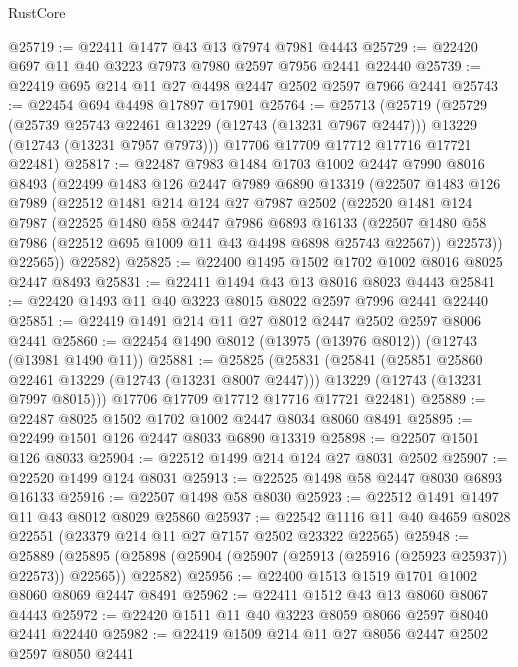 \begin{lexlean}{RustCore}
\begin{coremodule}
@25719 := @22411 @1477 @43 @13 @7974 @7981 @4443
@25729 := @22420 @697 @11 @40 @3223 @7973 @7980 @2597 @7956 @2441 @22440
@25739 := @22419 @695 @214 @11 @27 @4498 @2447 @2502 @2597 @7966 @2441
@25743 := @22454 @694 @4498 @17897 @17901
@25764 := @25713
    (@25719
      (@25729
        (@25739 @25743 @22461 @13229 (@12743 (@13231 @7967 @2447)))
        @13229
        (@12743 (@13231 @7957 @7973)))
      @17706
      @17709
      @17712
      @17716
      @17721
      @22481)
@25817 := @22487
    @7983
    @1484
    @1703
    @1002
    @2447
    @7990
    @8016
    @8493
    (@22499
      @1483
      @126
      @2447
      @7989
      @6890
      @13319
      (@22507
        @1483
        @126
        @7989
        (@22512
          @1481
          @214
          @124
          @27
          @7987
          @2502
          (@22520
            @1481
            @124
            @7987
            (@22525
              @1480
              @58
              @2447
              @7986
              @6893
              @16133
              (@22507 @1480 @58 @7986 (@22512 @695 @1009 @11 @43 @4498 @6898 @25743 @22567))
              @22573))
          @22565))
      @22582)
@25825 := @22400 @1495 @1502 @1702 @1002 @8016 @8025 @2447 @8493
@25831 := @22411 @1494 @43 @13 @8016 @8023 @4443
@25841 := @22420 @1493 @11 @40 @3223 @8015 @8022 @2597 @7996 @2441 @22440
@25851 := @22419 @1491 @214 @11 @27 @8012 @2447 @2502 @2597 @8006 @2441
@25860 := @22454 @1490 @8012 (@13975 (@13976 @8012)) (@12743 (@13981 @1490 @11))
@25881 := @25825
    (@25831
      (@25841
        (@25851 @25860 @22461 @13229 (@12743 (@13231 @8007 @2447)))
        @13229
        (@12743 (@13231 @7997 @8015)))
      @17706
      @17709
      @17712
      @17716
      @17721
      @22481)
@25889 := @22487 @8025 @1502 @1702 @1002 @2447 @8034 @8060 @8491
@25895 := @22499 @1501 @126 @2447 @8033 @6890 @13319
@25898 := @22507 @1501 @126 @8033
@25904 := @22512 @1499 @214 @124 @27 @8031 @2502
@25907 := @22520 @1499 @124 @8031
@25913 := @22525 @1498 @58 @2447 @8030 @6893 @16133
@25916 := @22507 @1498 @58 @8030
@25923 := @22512 @1491 @1497 @11 @43 @8012 @8029 @25860
@25937 := @22542 @1116 @11 @40 @4659 @8028 @22551 (@23379 @214 @11 @27 @7157 @2502 @23322 @22565)
@25948 := @25889
    (@25895 (@25898 (@25904 (@25907 (@25913 (@25916 (@25923 @25937)) @22573)) @22565)) @22582)
@25956 := @22400 @1513 @1519 @1701 @1002 @8060 @8069 @2447 @8491
@25962 := @22411 @1512 @43 @13 @8060 @8067 @4443
@25972 := @22420 @1511 @11 @40 @3223 @8059 @8066 @2597 @8040 @2441 @22440
@25982 := @22419 @1509 @214 @11 @27 @8056 @2447 @2502 @2597 @8050 @2441

\end{coremodule}
\end{lexlean}

